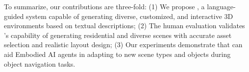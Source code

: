 To summarize, our contributions are three-fold: (1) We propose \holodeck, a language-guided system capable of generating diverse, customized, and interactive 3D environments based on textual descriptions; (2) The human evaluation validates \holodeck's capability of generating residential and diverse scenes with accurate asset selection and realistic layout design; (3) Our experiments demonstrate that \holodeck can aid Embodied AI agents in adapting to new scene types and objects during object navigation tasks.



